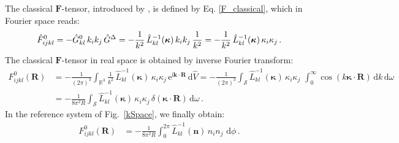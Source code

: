 The classical $\bm F$-tensor, introduced by  \cite{Kirchner:1983}, is defined by Eq. \eqref{F_classical}, which in Fourier space reads:
\begin{align}
\hat{F}^0_{ijkl}=-\hat{G}^0_{kl}\,k_ik_j\,\hat{G}^\Delta=-\frac{1}{k^2}\,\hat{L}^{-1}_{kl}(\bm \kappa)\,k_ik_j\, \frac{1}{k^2}=-\frac{1}{k^2}\,\hat{L}^{-1}_{kl}(\bm \kappa)\,\kappa_i\kappa_j\, .
\end{align}
The  classical $\bm F$-tensor in real space is obtained by inverse Fourier transform:
\begin{align}
F^0_{ijkl}(\bm R)&=-\frac{1}{(2\pi)^3}\int_{\mathbb{R}^3}\frac{1}{k^2}\,\hat{L}^{-1}_{kl}(\bm \kappa)\,\kappa_i\kappa_j\, \text{e}^{\text{i}\bm k\cdot\bm R} \, \text{d}\hat{V}
=-\frac{1}{(2\pi)^3}\int_\mathcal{S}\hat{L}^{-1}_{kl}(\bm \kappa)\,\kappa_i\kappa_j\,\, \int_0^\infty \cos(k\bm\kappa\cdot\bm R)\, \text{d}k  \, \text{d}\omega\nonumber\\
&=-\frac{1}{8\pi^2R}\int_\mathcal{S}\hat{L}^{-1}_{kl}(\bm \kappa)\,\kappa_i\kappa_j\, \delta(\bm\kappa\cdot\bm R)  \, \text{d}\omega\, .
\end{align}
In the reference system of Fig.~\ref{kSpace}, we finally obtain:
\begin{align}
F^0_{ijkl}(\bm R)&=-\frac{1}{8\pi^2R}\int_0^{2\pi}\hat{L}^{-1}_{kl}(\bm n)\,n_in_j\,   \, \text{d}\phi\, .
\label{F0}
\end{align}







